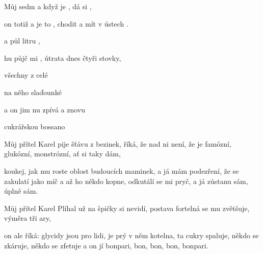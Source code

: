 

\zs
Můj   sedm  
a když je , dá si ,

on totiž  
a je to , chodit 
a   mít v ústech .  
 
\ks


\zr
{}   a půl litru 
,

 hu půjč mi , útrata dnes 
 čtyři stovky,

všechny  z celé 

na něho  slaďounké 

a on jim nu zpívá  a znovu

  cukrářskou bossano  
 
\kr

\zs
Můj přítel Karel pije šťávu z bezinek,
říká, že nad ni není,
že je famózní, glukózní, monstrózní, ať si taky dám,

koukej, jak mu roste oblost budoucích maminek,
a já mám podezření,
že se zakulatí jako míč
a až ho někdo kopne, odkutálí se mi pryč,
a já zůstanu sám, úplně sám.
\ks

\zr  \kr

\zs
Můj přítel Karel Plíhal už na špičky si nevidí,
postava fortelná se mu zvětšuje,
výměra tři ary,

on ale říká: glycidy jsou pro lidi,
je prý v něm kotelna, ta cukry spaluje,
někdo se zkáruje, někdo se zfetuje
a on jí bonpari, bon, bon, bon, bonpari.
\ks

\zr  \kr

\kp





